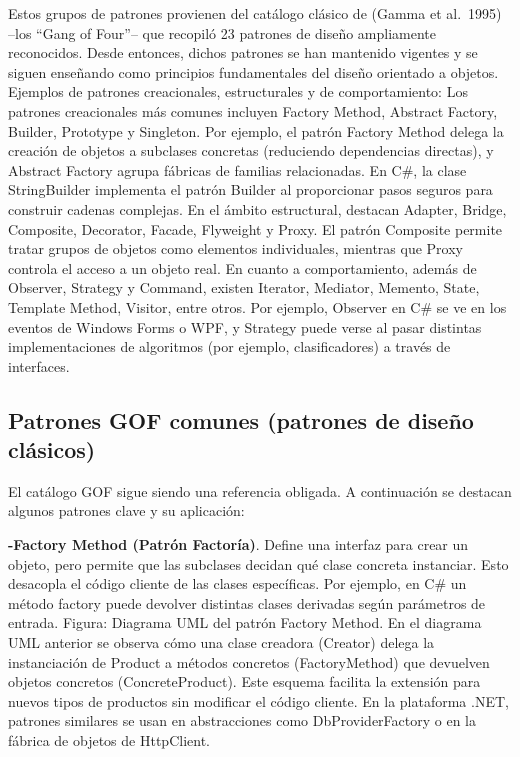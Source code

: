 \documentclass[
  11pt,
  letterpaper,
]{article}
\begin{document}
Estos grupos de patrones provienen del catálogo clásico de (Gamma et
al.~1995) --los ``Gang of Four''-- que recopiló 23 patrones de diseño
ampliamente reconocidos. Desde entonces, dichos patrones se han
mantenido vigentes y se siguen enseñando como principios fundamentales
del diseño orientado a objetos. Ejemplos de patrones creacionales,
estructurales y de comportamiento: Los patrones creacionales más comunes
incluyen Factory Method, Abstract Factory, Builder, Prototype y
Singleton. Por ejemplo, el patrón Factory Method delega la creación de
objetos a subclases concretas (reduciendo dependencias directas), y
Abstract Factory agrupa fábricas de familias relacionadas. En C\#, la
clase StringBuilder implementa el patrón Builder al proporcionar pasos
seguros para construir cadenas complejas. En el ámbito estructural,
destacan Adapter, Bridge, Composite, Decorator, Facade, Flyweight y
Proxy. El patrón Composite permite tratar grupos de objetos como
elementos individuales, mientras que Proxy controla el acceso a un
objeto real. En cuanto a comportamiento, además de Observer, Strategy y
Command, existen Iterator, Mediator, Memento, State, Template Method,
Visitor, entre otros. Por ejemplo, Observer en C\# se ve en los eventos
de Windows Forms o WPF, y Strategy puede verse al pasar distintas
implementaciones de algoritmos (por ejemplo, clasificadores) a través de
interfaces.

\subsection{Patrones GOF comunes (patrones de diseño
clásicos)}\label{patrones-gof-comunes-patrones-de-diseuxf1o-cluxe1sicos}

El catálogo GOF sigue siendo una referencia obligada. A continuación se
destacan algunos patrones clave y su aplicación:

\textbf{-Factory Method (Patrón Factoría)}. Define una interfaz para
crear un objeto, pero permite que las subclases decidan qué clase
concreta instanciar. Esto desacopla el código cliente de las clases
específicas. Por ejemplo, en C\# un método factory puede devolver
distintas clases derivadas según parámetros de entrada. Figura: Diagrama
UML del patrón Factory Method. En el diagrama UML anterior se observa
cómo una clase creadora (Creator) delega la instanciación de Product a
métodos concretos (FactoryMethod) que devuelven objetos concretos
(ConcreteProduct). Este esquema facilita la extensión para nuevos tipos
de productos sin modificar el código cliente. En la plataforma .NET,
patrones similares se usan en abstracciones como DbProviderFactory o en
la fábrica de objetos de HttpClient.
\end{document}
